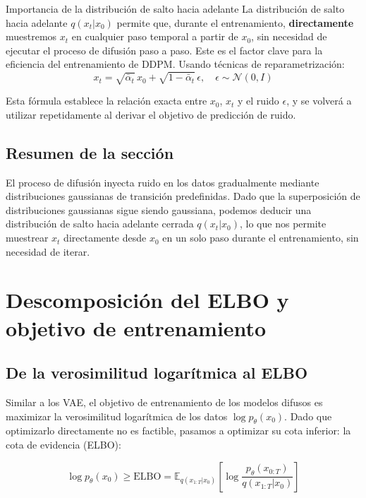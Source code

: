 \documentclass[a4paper]{article}
\begin{document}
\begin{importantbox}{Importancia de la distribución de salto hacia adelante}
La distribución de salto hacia adelante $q(x_t|x_0)$ permite que, durante el entrenamiento, \textbf{directamente} muestremos $x_t$ en cualquier paso temporal a partir de $x_0$, sin necesidad de ejecutar el proceso de difusión paso a paso. Este es el factor clave para la eficiencia del entrenamiento de DDPM. Usando técnicas de reparametrización:
$$x_t = \sqrt{\bar{\alpha}_t}\, x_0 + \sqrt{1 - \bar{\alpha}_t}\, \epsilon, \quad \epsilon \sim \mathcal{N}(0, I)$$
\end{importantbox}

Esta fórmula establece la relación exacta entre $x_0$, $x_t$ y el ruido $\epsilon$, y se volverá a utilizar repetidamente al derivar el objetivo de predicción de ruido.

\subsection{Resumen de la sección}

El proceso de difusión inyecta ruido en los datos gradualmente mediante distribuciones gaussianas de transición predefinidas. Dado que la superposición de distribuciones gaussianas sigue siendo gaussiana, podemos deducir una distribución de salto hacia adelante cerrada $q(x_t|x_0)$, lo que nos permite muestrear $x_t$ directamente desde $x_0$ en un solo paso durante el entrenamiento, sin necesidad de iterar.



\section{Descomposición del ELBO y objetivo de entrenamiento}

\subsection{De la verosimilitud logarítmica al ELBO}

Similar a los VAE, el objetivo de entrenamiento de los modelos difusos es maximizar la verosimilitud logarítmica de los datos $\log p_\theta(x_0)$. Dado que optimizarlo directamente no es factible, pasamos a optimizar su cota inferior: la cota de evidencia (ELBO):

$$\log p_\theta(x_0) \geq \text{ELBO} = \mathbb{E}_{q(x_{1:T}|x_0)}\left[\log \frac{p_\theta(x_{0:T})}{q(x_{1:T}|x_0)}\right]$$
\end{document}
